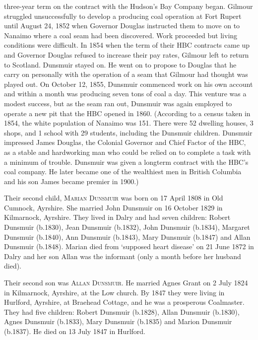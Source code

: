 three-year term on the contract with the Hudson's Bay Company began. Gilmour struggled unsuccessfully to develop a producing coal operation at Fort Rupert until August 24, 1852 when Governor Douglas instructed them to move on to Nanaimo where a coal seam had been discovered. Work proceeded but living conditions were difficult. In 1854 when the term of their HBC contracts came up and Governor Douglas refused to increase their pay rates, Gilmour left to return to Scotland. Dunsmuir stayed on. He went on to propose to Douglas that he carry on personally with the operation of a seam that Gilmour had thought was played out. On October 12, 1855, Dunsmuir commenced work on his own account and within a month was producing seven tons of coal a day. This venture was a modest success, but as the seam ran out, Dunsmuir was again employed to operate a new pit that the HBC opened in 1860.  (According to a census taken in 1854, the white population of Nanaimo was 151. There were 52 dwelling houses, 3 shops, and 1 school with 29 students, including the Dunsmuir children. Dunsmuir impressed James Douglas, the Colonial Governor and Chief Factor of the HBC, as a stable and hardworking man who could be relied on to complete a task with a minimum of trouble. Dunsmuir was given a longterm contract with the HBC’s coal company. He later became one of the wealthiest men in British Columbia and his son James became premier in 1900.)

Their second child, \textsc{Marian Dunsmuir} was born on 17 April 1808 in Old Cumnock, Ayrshire. She married John Dunsmuir on 16 October 1829 in Kilmarnock, Ayrshire. They lived in Dalry and had seven children:  Robert Dunsmuir (b.1830), Jean Dunsmuir (b.1832), John Dunsmuir (b.1834), Margaret Dunsmuir (b.1840), Ann Dunsmuir (b.1843), Mary Dunsmuir (b.1847) and Allan Dunsmuir (b.1848).  Marian died from `supposed heart disease' on 21 June 1872 in Dalry and her son Allan was the informant (only a month before her husband died).

Their second son was \textsc{Allan Dunsmuir}. He married Agnes Grant on 2 July 1824 in Kilmarnock, Ayrshire, at the Low church.  By 1847 they were living in Hurlford, Ayrshire, at Braehead Cottage, and he was a prosperous Coalmaster. They had five children: Robert Dunsmuir (b.1828), Allan Dunsmuir (b.1830), Agnes Dunsmuir (b.1833), Mary Dunsmuir (b.1835) and Marion Dunsmuir (b.1837). He died on 13 July 1847 in Hurlford.

  












